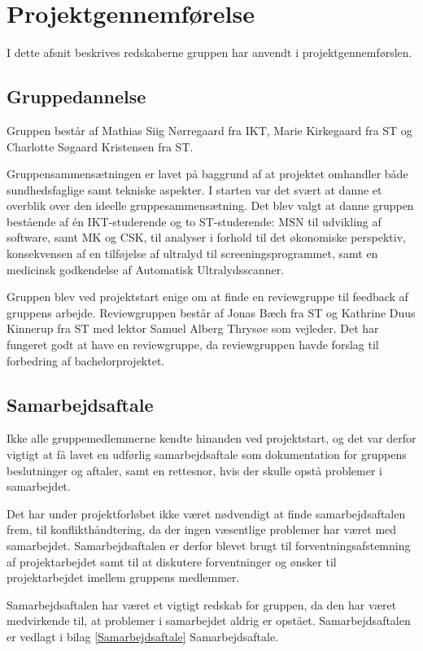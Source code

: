 \chapter{Projektgennemførelse}\label{kapitel_Projektgennemforelse}
I dette afsnit beskrives redskaberne gruppen har anvendt i projektgennemførslen. 

\section{Gruppedannelse}
Gruppen består af Mathias Siig Nørregaard fra IKT, Marie Kirkegaard fra ST og Charlotte Søgaard Kristensen fra ST. 

Gruppensammensætningen er lavet på baggrund af at projektet omhandler både sundhedsfaglige samt tekniske aspekter. I starten var det svært at danne et overblik over den ideelle gruppesammensætning. Det blev valgt at danne gruppen bestående af én IKT-studerende og to ST-studerende: MSN til udvikling af software, samt MK og CSK, til analyser i forhold til det økonomiske perspektiv, konsekvensen af en tilføjelse af ultralyd til screeningsprogrammet, samt en medicinsk godkendelse af Automatisk Ultralydsscanner. 

Gruppen blev ved projektstart enige om at finde en reviewgruppe til feedback af gruppens arbejde. Reviewgruppen består af Jonas Bæch fra ST og Kathrine Duus Kinnerup fra ST med lektor Samuel Alberg Thrysøe som vejleder. Det har fungeret godt at have en reviewgruppe, da reviewgruppen havde forslag til forbedring af bachelorprojektet.  

\section{Samarbejdsaftale}
Ikke alle gruppemedlemmerne kendte hinanden ved projektstart, og det var derfor vigtigt at få lavet en udførlig samarbejdsaftale som dokumentation for gruppens beslutninger og aftaler, samt en rettesnor, hvis der skulle opstå problemer i samarbejdet. 

Det har under projektforløbet ikke været nødvendigt at finde samarbejdsaftalen frem, til konflikthåndtering, da der ingen væsentlige problemer har været med samarbejdet. Samarbejdsaftalen er derfor blevet brugt til forventningsafstemning af projektarbejdet samt til at diskutere forventninger og ønsker til projektarbejdet imellem gruppens medlemmer. 

Samarbejdsaftalen har været et vigtigt redskab for gruppen, da den har været medvirkende til, at problemer i samarbejdet aldrig er opstået. Samarbejdsaftalen er vedlagt i bilag \ref{Samarbejdsaftale} Samarbejdsaftale. 

